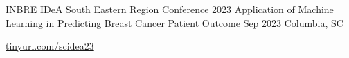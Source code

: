 




\begin{cventries}
    \cventry
        {INBRE IDeA South Eastern Region Conference 2023} %
        {Application of Machine Learning in Predicting Breast Cancer Patient Outcome} %
        {Sep 2023} %
        {Columbia, SC} %
        {
          \begin{cvitems} %
            \item {\href{https://www.scinbre.org/seidea23/poster-winners}{tinyurl.com/scidea23}}
          \end{cvitems}
        }


\end{cventries}
